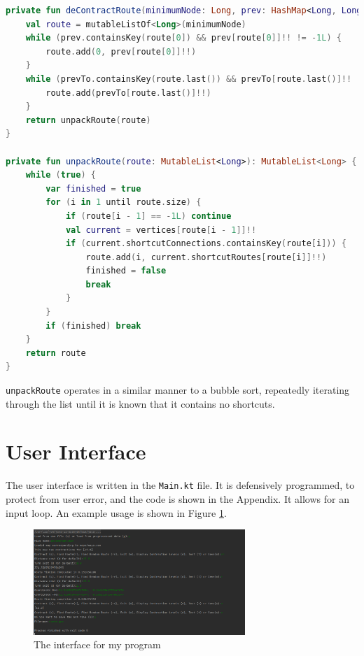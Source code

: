 \documentclass[11pt,twoside,a4paper]{report}
\begin{document}
\begin{lstlisting}[language=kotlin]
private fun deContractRoute(minimumNode: Long, prev: HashMap<Long, Long>, prevTo: HashMap<Long, Long>): List<Long> {
    val route = mutableListOf<Long>(minimumNode)
    while (prev.containsKey(route[0]) && prev[route[0]]!! != -1L) {
        route.add(0, prev[route[0]]!!)
    }
    while (prevTo.containsKey(route.last()) && prevTo[route.last()]!! != -1L) {
        route.add(prevTo[route.last()]!!)
    }
    return unpackRoute(route)
}

private fun unpackRoute(route: MutableList<Long>): MutableList<Long> {
    while (true) {
        var finished = true
        for (i in 1 until route.size) {
            if (route[i - 1] == -1L) continue
            val current = vertices[route[i - 1]]!!
            if (current.shortcutConnections.containsKey(route[i])) {
                route.add(i, current.shortcutRoutes[route[i]]!!)
                finished = false
                break
            }
        }
        if (finished) break
    }
    return route
}
\end{lstlisting}
\texttt{unpackRoute} operates in a similar manner to a bubble sort, repeatedly iterating through the list until it is known that it contains no shortcuts. 
\section{User Interface}
The user interface is written in the \texttt{Main.kt} file. It is defensively programmed, to protect from user error, and the code is shown in the Appendix. It allows for an input loop. An example usage is shown in Figure \ref{interface}.
\begin{figure}[t]
\begin{center}
\includegraphics[width=8cm]{interface.png}
\end{center}
\caption{The interface for my program}
\label{interface}
\end{figure}
\newpage
\end{document}
